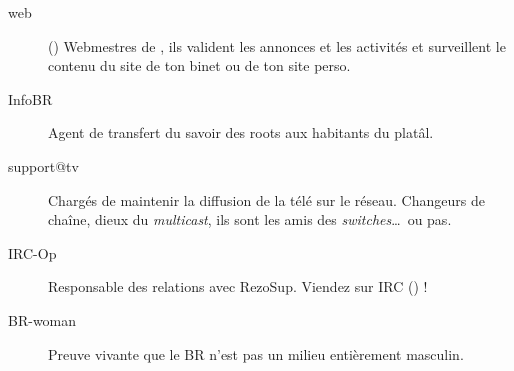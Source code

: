 \begin{description}
  \item[web] {() Webmestres de \fkz, ils valident les annonces et les activit\'es et surveillent le contenu du site de ton binet ou de ton site perso.}


  \item[InfoBR]{Agent de transfert du savoir des roots aux habitants du plat\^al.}

  \item[support@tv]{Charg\'es de maintenir la diffusion de la t\'el\'e sur le r\'eseau. Changeurs de cha\^ine, dieux du \emph{multicast}, ils sont les amis des \emph{switches}\dots\ ou pas.}


  \item[IRC-Op]{Responsable des relations avec RezoSup. Viendez sur IRC () !}


  \item[BR-woman]{Preuve vivante que le BR n'est pas un milieu enti\`erement masculin.}

\end{description}

